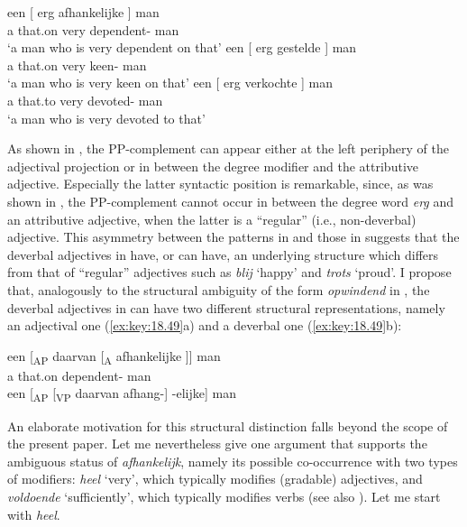 \documentclass[output=paper]{langsci/langscibook}
\begin{document}
\ea%
    \label{ex:key:18.48}
	\ea
	\gll een [  erg  afhankelijke ] man\\
    a {} \phantom{〈}that.on very {} dependent-\Agr{} {} man\\
	\glt \enquote*{a man who is very dependent on that}
	\ex
	\gll een [  erg  gestelde ] man\\
    a {} \phantom{〈}that.on very {} keen-\Agr{} {} man\\
	\glt \enquote*{a man who is very keen on that}
	\ex
	\gll een [  erg  verkochte ] man\\
    a {} \phantom{〈}that.to very {} devoted-\Agr{} {} man\\
	\glt \enquote*{a man who is very devoted to that}
	\z
\z

As shown in , the PP-complement can appear either at the left
periphery of the adjectival projection or in between the degree modifier and
the attributive adjective. Especially the latter syntactic position is
remarkable, since, as was shown in , the PP-complement cannot
occur in between the degree word \emph{erg} and an attributive adjective, when
the latter is a \enquote{regular} (i.e., non-deverbal) adjective. This
asymmetry between the patterns in  and those in 
suggests that the deverbal adjectives in  have, or can have, an
underlying structure which differs from that of \enquote{regular} adjectives
such as \emph{blij} \enquote*{happy} and \emph{trots} \enquote*{proud}. I
propose that, analogously to the structural ambiguity of the form
\emph{opwindend} in , the deverbal adjectives in 
can have two different structural representations, namely an adjectival one
(\ref{ex:key:18.49}a) and a deverbal one (\ref{ex:key:18.49}b):

\ea%
    \label{ex:key:18.49}
	\ea
	\gll een [\textsubscript{AP} daarvan [\textsubscript{A} afhankelijke ]] man\\
        a {} that.on {} dependent-\Agr{} {} man\\
	\ex een [\textsubscript{AP} [\textsubscript{VP} daarvan afhang-] -elijke] man
	\z
\z

An elaborate motivation for this structural distinction falls beyond the scope
of the present paper. Let me nevertheless give one argument that supports the
ambiguous status of \emph{afhankelijk}, namely its possible co-occurrence with
two types of modifiers: \emph{heel} \enquote*{very}, which typically modifies
(gradable) adjectives, and \emph{voldoende} \enquote*{sufficiently}, which
typically modifies verbs (see also \citealt{Broekhuis2013}). Let me start with
\emph{heel}.
\end{document}
